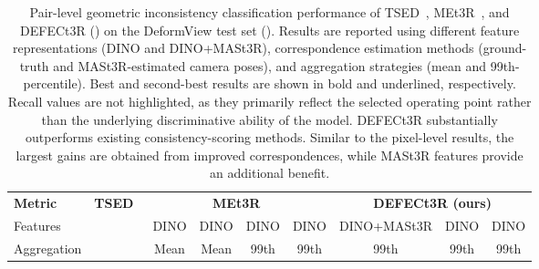 \begin{table}[tb]
    \centering

    \newcommand{\best}[1]{\textbf{#1}}
    \newcommand{\seco}[1]{\underline{#1}}
    \newcommand{\othe}[1]{#1}


    

    \caption{
        Pair-level geometric inconsistency classification performance of TSED~\cite{TSED}, MEt3R~\cite{MEt3R}, and DEFECt3R () on the DeformView test set (). 
        Results are reported using different feature representations (DINO and DINO+MASt3R), correspondence estimation methods (ground-truth and MASt3R-estimated camera poses), and aggregation strategies (mean and 99th-percentile).
        Best and second-best results are shown in bold and underlined, respectively. 
        Recall values are not highlighted, as they primarily reflect the selected operating point rather than the underlying discriminative ability of the model.
        DEFECt3R substantially outperforms existing consistency-scoring methods. Similar to the pixel-level results, the largest gains are obtained from improved correspondences, while MASt3R features provide an additional benefit. 
    }
    \label{table:evaluation-pair-level}

    \begin{tabular}{l c c c c c c c c c}
        
        \toprule
        
        \textbf{Metric}
        & \multicolumn{2}{c}{\textbf{TSED}~\cite{TSED}}
        
        & \multicolumn{4}{c}{\textbf{MEt3R}~\cite{MEt3R}}
        
        & \multicolumn{3}{c}{\textbf{DEFECt3R (ours)}} \\

        
        Features
        & & & DINO & DINO & DINO & DINO & DINO+MASt3R & DINO & DINO \\
        
        Aggregation
        & & & Mean & Mean & 99th & 99th & 99th & 99th & 99th \\


\end{tabular}
\end{table}
